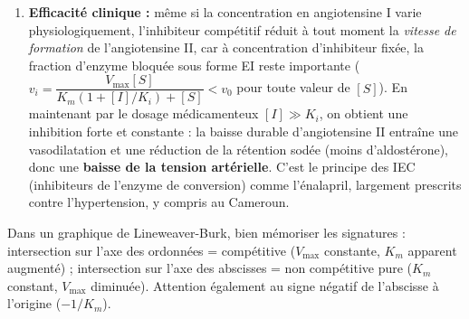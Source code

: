 \documentclass[11pt]{article}
\begin{document}
\begin{corrige}
\begin{enumerate}
    \item \textbf{Efficacité clinique :} même si la concentration en angiotensine I varie physiologiquement, l'inhibiteur compétitif réduit à tout moment la \emph{vitesse de formation} de l'angiotensine II, car à concentration d'inhibiteur fixée, la fraction d'enzyme bloquée sous forme EI reste importante ($v_i = \dfrac{V_{\text{max}}[S]}{K_m(1+[I]/K_i) + [S]} < v_0$ pour toute valeur de $[S]$). En maintenant par le dosage médicamenteux $[I] \gg K_i$, on obtient une inhibition forte et constante : la baisse durable d'angiotensine II entraîne une vasodilatation et une réduction de la rétention sodée (moins d'aldostérone), donc une \textbf{baisse de la tension artérielle}. C'est le principe des IEC (inhibiteurs de l'enzyme de conversion) comme l'énalapril, largement prescrits contre l'hypertension, y compris au Cameroun.
\end{enumerate}
\end{corrige}

\begin{attention}
Dans un graphique de Lineweaver-Burk, bien mémoriser les signatures : intersection sur l'axe des ordonnées = compétitive ($V_{\text{max}}$ constante, $K_m$ apparent augmenté) ; intersection sur l'axe des abscisses = non compétitive pure ($K_m$ constant, $V_{\text{max}}$ diminuée). Attention également au signe négatif de l'abscisse à l'origine ($-1/K_m$).
\end{attention}
\end{document}
